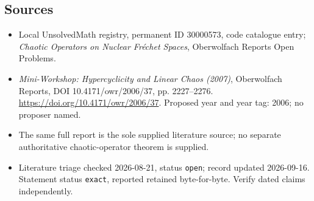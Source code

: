 \documentclass[11pt]{article}
\begin{document}
\subsection{Sources}
\begin{itemize}\item Local UnsolvedMath registry, permanent ID 30000573, code catalogue entry; \emph{Chaotic Operators on Nuclear Fr\'echet Spaces}, Oberwolfach Reports Open Problems.\item \emph{Mini-Workshop: Hypercyclicity and Linear Chaos (2007)}, Oberwolfach Reports, DOI 10.4171/owr/2006/37, pp. 2227--2276. \url{https://doi.org/10.4171/owr/2006/37}. Proposed year and year tag: 2006; no proposer named.\item The same full report is the sole supplied literature source; no separate authoritative chaotic-operator theorem is supplied.\item Literature triage checked 2026-08-21, status \texttt{open}; record updated 2026-09-16. Statement status \texttt{exact}, reported retained byte-for-byte. Verify dated claims independently.\end{itemize}
\end{document}
